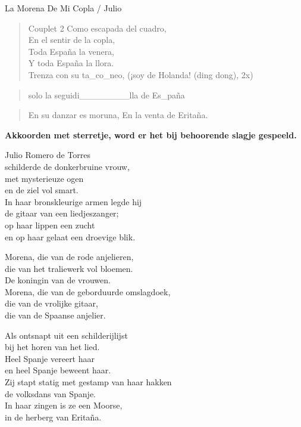 \begin{song}{La Morena De Mi Copla / Julio}

\begin{verse}{Couplet 2}
Como escapada del cuadro,\\
En el sentir de la copla,\\
Toda España la venera,\chord{}\\
Y toda España la llora.\\
Trenza con su ta\_co\_neo, (¡soy de Holanda! \small{(ding dong)}, 2x)
\end{verse}

\begin{verse}{solo}
la seguidi\_\_\_\_\_\_\_\_lla de Es\_paña
\end{verse}

\begin{verse}{}
En su danzar es moruna,\hspace{4em}
En la venta de Eritaña.

\end{verse}
\end{song}

\clearpage
\textbf{Akkoorden met sterretje, word er het bij behoorende slagje gespeeld.}\\

\begin{translation}
Julio Romero de Torres\\
schilderde de donkerbruine vrouw,\\
met mysterieuze ogen\\
en de ziel vol smart.\\
In haar bronskleurige armen legde hij\\
de gitaar van een liedjeszanger;\\
op haar lippen een zucht\\
en op haar gelaat een droevige blik.\vspace{\wlskip}

Morena, die van de rode anjelieren,\\
die van het traliewerk vol bloemen.\\
De koningin van de vrouwen.\\
Morena, die van de geborduurde omslagdoek,\\
die van de vrolijke gitaar,\\
die van de Spaanse anjelier.\vspace{\wlskip}

Als ontsnapt uit een schilderijlijst\\
bij het horen van het lied.\\
Heel Spanje vereert haar\\
en heel Spanje beweent haar.\\
Zij stapt statig met gestamp van haar hakken\\
de volksdans van Spanje.\\
In haar zingen is ze een Moorse,\\
in de herberg van Eritaña.
\end{translation}
